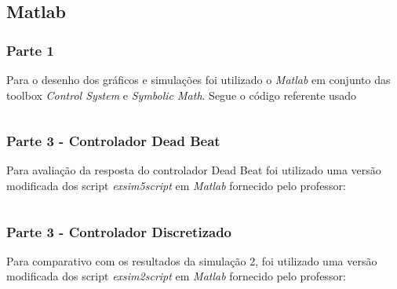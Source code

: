 \documentclass[a4paper,11pt]{article}
\begin{document}
\inputminted[xleftmargin=15pt,linenos,frame=single,framesep=5pt,breaklines=true]{python}{../python/exsim5.py}

\newpage
\subsection*{Matlab}

\subsubsection*{Parte 1}
Para o desenho dos gráficos e simulações foi utilizado o \textit{Matlab} em conjunto das toolbox \textit{Control System}\cite{matlabcontrol} e \textit{Symbolic Math}\cite{matlabsymbolic}. Segue o código referente usado

\inputminted[xleftmargin=15pt,linenos,frame=single,framesep=5pt,breaklines=true]{matlab}{../matlab/exsim5/exsim5.m}

\newpage
\subsubsection*{Parte 3 - Controlador Dead Beat}
Para avaliação da resposta do controlador Dead Beat foi utilizado uma versão modificada dos script \textit{exsim5script} em \textit{Matlab} fornecido pelo professor:
\inputminted[xleftmargin=15pt,linenos,frame=single,framesep=5pt,breaklines=true]{matlab}{../matlab/exsim5/exsim5script.m}

\newpage
\subsubsection*{Parte 3 - Controlador Discretizado}
Para comparativo com os resultados da simulação 2, foi utilizado uma versão modificada dos script \textit{exsim2script} em \textit{Matlab} fornecido pelo professor:
\inputminted[xleftmargin=15pt,linenos,frame=single,framesep=5pt,breaklines=true]{matlab}{../matlab/exsim5/exsim2script.m}



\end{document}
